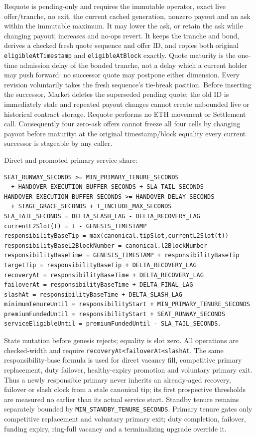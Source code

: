 \documentclass[a4paper,11pt]{article}
\newcommand{\code}[1]{\nolinkurl{#1}}
\begin{document}
Requote is pending-only and requires the immutable operator, exact live
offer/tranche, no exit, the current cached generation, nonzero payout and
an ask within the immutable maximum.  It may lower the ask, or retain the ask
while changing payout; increases and no-ops revert.  It keeps the tranche and
bond, derives a checked fresh quote sequence and offer ID, and copies both
original
\code{eligibleAtTimestamp} and \code{eligibleAtBlock} exactly.  Quote maturity
is the one-time admission delay of the bonded tranche, not a delay which a
current holder may push forward: no successor quote may postpone either
dimension.  Every revision voluntarily takes the fresh sequence's tie-break
position.  Before inserting the successor, Market deletes the superseded
pending quote; the old ID is immediately stale and repeated payout changes
cannot create unbounded live or historical contract storage.  Requote performs
no ETH movement or Settlement call.  Consequently four zero-ask offers cannot
freeze all four cells by changing payout before maturity: at the original
timestamp/block equality every current successor is stageable by any caller.

Direct and promoted primary service share:
\begin{verbatim}
SEAT_RUNWAY_SECONDS >= MIN_PRIMARY_TENURE_SECONDS
  + HANDOVER_EXECUTION_BUFFER_SECONDS + SLA_TAIL_SECONDS
HANDOVER_EXECUTION_BUFFER_SECONDS >= HANDOVER_DELAY_SECONDS
  + STAGE_GRACE_SECONDS + T_INCLUDE_MAX_SECONDS
SLA_TAIL_SECONDS = DELTA_SLASH_LAG - DELTA_RECOVERY_LAG
currentL2Slot(t) = t - GENESIS_TIMESTAMP
responsibilityBaseTip = max(canonical.tipSlot,currentL2Slot(t))
responsibilityBaseL2BlockNumber = canonical.l2BlockNumber
responsibilityBaseTime = GENESIS_TIMESTAMP + responsibilityBaseTip
targetTip = responsibilityBaseTip + DELTA_RECOVERY_LAG
recoveryAt = responsibilityBaseTime + DELTA_RECOVERY_LAG
failoverAt = responsibilityBaseTime + DELTA_FINAL_LAG
slashAt = responsibilityBaseTime + DELTA_SLASH_LAG
minimumTenureUntil = responsibilityStart + MIN_PRIMARY_TENURE_SECONDS
premiumFundedUntil = responsibilityStart + SEAT_RUNWAY_SECONDS
serviceEligibleUntil = premiumFundedUntil - SLA_TAIL_SECONDS.
\end{verbatim}
State mutation before genesis rejects; equality is slot zero.  All operations
are checked-width and require \code{recoveryAt<failoverAt<slashAt}.  The same responsibility-base formula is
used for direct vacancy fill, competitive primary replacement, duty failover,
healthy-expiry promotion and voluntary primary exit.  Thus a newly responsible
primary never inherits an already-aged recovery, failover or slash clock from a
stale canonical tip; its first prospective thresholds are measured no earlier
than its actual service start.  Standby tenure remains separately bounded by
\code{MIN_STANDBY_TENURE_SECONDS}.  Primary tenure gates only competitive
replacement and voluntary primary exit; duty completion, failover, funding
expiry, ring-full vacancy and a terminalizing upgrade override it.
\end{document}
